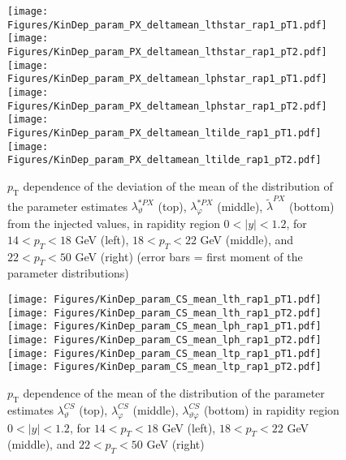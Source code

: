 \documentclass[12pt]{article}
\newcommand{\pT}{p_\mathrm{T}}
\newcommand{\absy}{\left |  y \right |}
\newcommand{\lamthCS}{\lambda^{\scriptscriptstyle CS}_\vartheta}
\newcommand{\lamphCS}{\lambda^{\scriptscriptstyle CS}_\varphi}
\newcommand{\lamthphCS}{\lambda^{\scriptscriptstyle CS}_{\vartheta \varphi}}
\newcommand{\lamtildePX}{\tilde{\lambda}^{\scriptscriptstyle PX}}
\newcommand{\lamthstarPX}{\lambda^{* \scriptscriptstyle PX}_\vartheta}
\newcommand{\lamphstarPX}{\lambda^{* \scriptscriptstyle PX}_\varphi}
\begin{document}
\begin{figure}[htbp]
\centering
\texttt{[image: Figures/KinDep\_param\_PX\_deltamean\_lthstar\_rap1\_pT1.pdf]}
\texttt{[image: Figures/KinDep\_param\_PX\_deltamean\_lthstar\_rap1\_pT2.pdf]}
\texttt{[image: Figures/KinDep\_param\_PX\_deltamean\_lphstar\_rap1\_pT1.pdf]}
\texttt{[image: Figures/KinDep\_param\_PX\_deltamean\_lphstar\_rap1\_pT2.pdf]}
\texttt{[image: Figures/KinDep\_param\_PX\_deltamean\_ltilde\_rap1\_pT1.pdf]}
\texttt{[image: Figures/KinDep\_param\_PX\_deltamean\_ltilde\_rap1\_pT2.pdf]}
\caption{$\pT$ dependence of the deviation of the mean of the distribution of
the parameter estimates $\lamthstarPX$ (top), $\lamphstarPX$ (middle),
$\lamtildePX$ (bottom) from the injected values, in rapidity
region $0<\absy<1.2$, for $14 < p_T < 18$ GeV (left), $18 < p_T < 22$ GeV (middle), and $22 < p_T < 50$ GeV (right) (error bars = first moment of
the parameter distributions)}
\end{figure}
\clearpage










\begin{figure}[htbp]
\centering
\texttt{[image: Figures/KinDep\_param\_CS\_mean\_lth\_rap1\_pT1.pdf]}
\texttt{[image: Figures/KinDep\_param\_CS\_mean\_lth\_rap1\_pT2.pdf]}
\texttt{[image: Figures/KinDep\_param\_CS\_mean\_lph\_rap1\_pT1.pdf]}
\texttt{[image: Figures/KinDep\_param\_CS\_mean\_lph\_rap1\_pT2.pdf]}
\texttt{[image: Figures/KinDep\_param\_CS\_mean\_ltp\_rap1\_pT1.pdf]}
\texttt{[image: Figures/KinDep\_param\_CS\_mean\_ltp\_rap1\_pT2.pdf]}
\caption{$\pT$ dependence of the mean of the distribution of the parameter estimates $\lamthCS$ (top), $\lamphCS$ (middle), $\lamthphCS$ (bottom) in rapidity
region $0<\absy<1.2$, for $14 < p_T < 18$ GeV (left), $18 < p_T < 22$ GeV (middle), and $22 < p_T < 50$ GeV (right)}
\end{figure}
\clearpage
\end{document}
